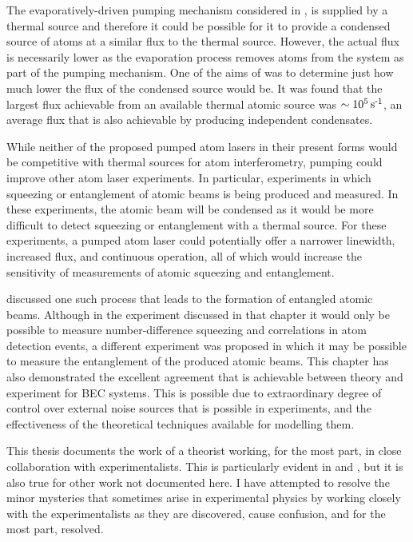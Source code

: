 The evaporatively-driven pumping mechanism considered in , is supplied by a thermal source and therefore it could be possible for it to provide a condensed source of atoms at a similar flux to the thermal source.  However, the actual flux is necessarily lower as the evaporation process removes atoms from the system as part of the pumping mechanism.  One of the aims of  was to determine just how much lower the flux of the condensed source would be.  It was found that the largest flux achievable from an available thermal atomic source was $\sim\unit[10^5]{s\textsuperscript{-1}}$, an average flux that is also achievable by producing independent condensates.

While neither of the proposed pumped atom lasers in their present forms would be competitive with thermal sources for atom interferometry, pumping could improve other atom laser experiments.  In particular, experiments in which squeezing or entanglement of atomic beams is being produced and measured.  In these experiments, the atomic beam will be condensed as it would be more difficult to detect squeezing or entanglement with a thermal source.  For these experiments, a pumped atom laser could potentially offer a narrower linewidth, increased flux, and continuous operation, all of which would increase the sensitivity of measurements of atomic squeezing and entanglement.

 discussed one such process that leads to the formation of entangled atomic beams.  Although in the experiment discussed in that chapter it would only be possible to measure number-difference squeezing and correlations in atom detection events, a different experiment was proposed in which it may be possible to measure the entanglement of the produced atomic beams.  This chapter has also demonstrated the excellent agreement that is achievable between theory and experiment for BEC systems.  This is possible due to extraordinary degree of control over external noise sources that is possible in experiments, and the effectiveness of the theoretical techniques available for modelling them.

\parasep

This thesis documents the work of a theorist working, for the most part, in close collaboration with experimentalists.  This is particularly evident in  and , but it is also true for other work not documented here.  I have attempted to resolve the minor mysteries that sometimes arise in experimental physics by working closely with the experimentalists as they are discovered, cause confusion, and for the most part, resolved.

